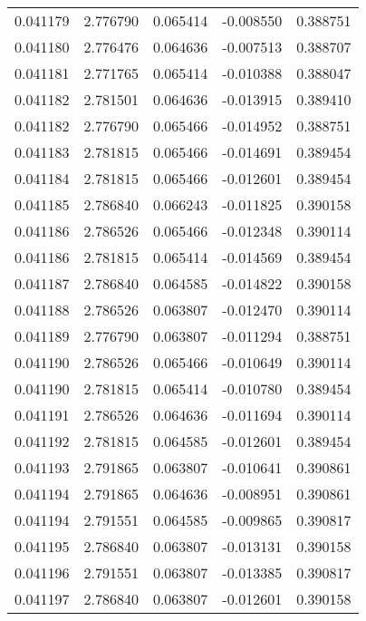 \begin{tabular}{lrrrr}
0.041179    &  2.776790 &  0.065414 & -0.008550 &             0.388751 \\
0.041180    &  2.776476 &  0.064636 & -0.007513 &             0.388707 \\
0.041181    &  2.771765 &  0.065414 & -0.010388 &             0.388047 \\
0.041182    &  2.781501 &  0.064636 & -0.013915 &             0.389410 \\
0.041182    &  2.776790 &  0.065466 & -0.014952 &             0.388751 \\
0.041183    &  2.781815 &  0.065466 & -0.014691 &             0.389454 \\
0.041184    &  2.781815 &  0.065466 & -0.012601 &             0.389454 \\
0.041185    &  2.786840 &  0.066243 & -0.011825 &             0.390158 \\
0.041186    &  2.786526 &  0.065466 & -0.012348 &             0.390114 \\
0.041186    &  2.781815 &  0.065414 & -0.014569 &             0.389454 \\
0.041187    &  2.786840 &  0.064585 & -0.014822 &             0.390158 \\
0.041188    &  2.786526 &  0.063807 & -0.012470 &             0.390114 \\
0.041189    &  2.776790 &  0.063807 & -0.011294 &             0.388751 \\
0.041190    &  2.786526 &  0.065466 & -0.010649 &             0.390114 \\
0.041190    &  2.781815 &  0.065414 & -0.010780 &             0.389454 \\
0.041191    &  2.786526 &  0.064636 & -0.011694 &             0.390114 \\
0.041192    &  2.781815 &  0.064585 & -0.012601 &             0.389454 \\
0.041193    &  2.791865 &  0.063807 & -0.010641 &             0.390861 \\
0.041194    &  2.791865 &  0.064636 & -0.008951 &             0.390861 \\
0.041194    &  2.791551 &  0.064585 & -0.009865 &             0.390817 \\
0.041195    &  2.786840 &  0.063807 & -0.013131 &             0.390158 \\
0.041196    &  2.791551 &  0.063807 & -0.013385 &             0.390817 \\
0.041197    &  2.786840 &  0.063807 & -0.012601 &             0.390158 \\

\end{tabular}
